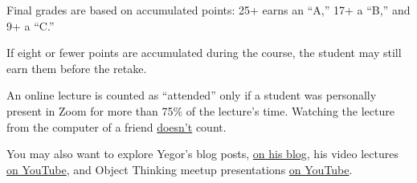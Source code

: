 \documentclass[nobrand,anonymous,nodate,nosecurity]{huawei}
\begin{document}
Final grades are based on accumulated points: 25+ earns an ``A,'' 17+ a ``B,'' and 9+ a ``C.''

If eight or fewer points are accumulated during the course, the student may still earn them before the retake.

An online lecture is counted as ``attended'' only if a student was personally present in Zoom for more than 75\% of the lecture's time.
Watching the lecture from the computer of a friend \ul{doesn't} count.

\newpage
\renewcommand\refname{Learning Materials}
\printbibliography

You may also want to explore Yegor's blog posts, \href{https://www.yegor256.com/tag/oop}{on his blog}, his video lectures \href{https://www.youtube.com/playlist?list=PLaIsQH4uc08yw2CsNv5OV30GfKE6XVGii}{on YouTube}, and Object Thinking meetup presentations \href{https://www.youtube.com/watch?v=yT6oO28wEik&list=PLaIsQH4uc08yetzX86w1pPck1QtGEy_ik}{on YouTube}.
\end{document}
